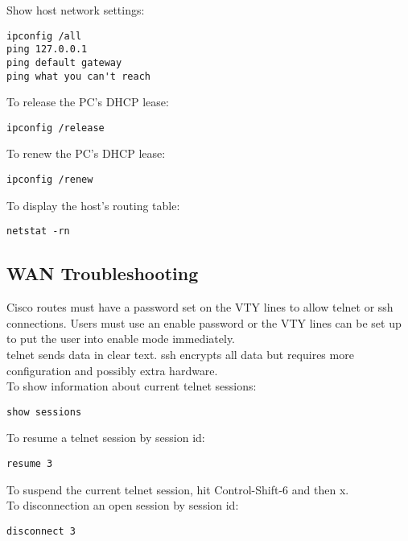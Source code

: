 Show host network settings:

\begin{verbatim}
ipconfig /all
ping 127.0.0.1
ping default gateway
ping what you can't reach
\end{verbatim}

To release the PC's DHCP lease:

\begin{verbatim}
ipconfig /release
\end{verbatim}

To renew the PC's DHCP lease:

\begin{verbatim}
ipconfig /renew
\end{verbatim}

To display the host's routing table:

\begin{verbatim}
netstat -rn
\end{verbatim}

\subsection{WAN Troubleshooting}

Cisco routes must have a password set on the VTY lines to allow telnet or
ssh connections. Users must use an enable password or the VTY lines can be
set up to put the user into enable mode immediately.\\

telnet sends data in clear text. ssh encrypts all data but requires more
configuration and possibly extra hardware.\\

To show information about current telnet sessions:

\begin{verbatim}
show sessions
\end{verbatim}

To resume a telnet session by session id:

\begin{verbatim}
resume 3
\end{verbatim}

To suspend the current telnet session, hit Control-Shift-6 and then x.\\

To disconnection an open session by session id:

\begin{verbatim}
disconnect 3
\end{verbatim}

